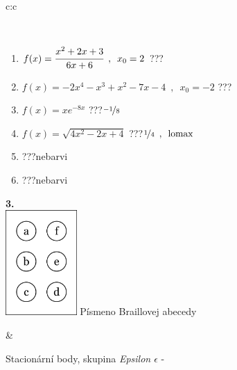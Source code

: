 \documentclass[10pt]{report}
\begin{document}
\begin{tabular}{c:c}
\begin{minipage}[c][104.5mm][t]{0.5\linewidth}
\begin{center}
\begin{minipage}{0.95\linewidth}
\begin{center}
\end{center}
\end{minipage}
\\[1mm]
\begin{minipage}{0.79\linewidth}
\begin{center}
\begin{varwidth}{\linewidth}
\begin{enumerate}
\normalsize
\item $f(x)=\cfrac{x^2+2x+3}{6x+6}\enspace , \enspace x_0=2$\quad \dotfill\; ???\;\dotfill \quad {}
\item $f(x)=-2x^4-x^3+x^2-7x-4\enspace , \enspace x_0=-2$\quad \dotfill\; ???\;\dotfill \quad {}
\item $f(x)=xe^{-8x}$\quad \dotfill\; ???\;\dotfill \quad $\nicefrac{-1}{8}$
\item $f(x)=\sqrt{4x^2-2x+4}$\quad \dotfill\; ???\;\dotfill \quad $\nicefrac{1}{4}\enspace , \enspace\mathrm{lomax}$
\item \quad \dotfill\; ???\;\dotfill \quad nebarvi
\item \quad \dotfill\; ???\;\dotfill \quad nebarvi
\end{enumerate}
\end{varwidth}
\end{center}
\end{minipage}
\begin{minipage}{0.20\linewidth}
\begin{center}
{\Huge\bfseries 3.} \\[2mm]
\includegraphics[height=40mm]{../images/braille.png}
{\small Písmeno Braillovej abecedy}
\end{center}
\end{minipage}
\end{center}
\end{minipage}
&
\begin{minipage}[c][104.5mm][t]{0.5\linewidth}
\begin{center}
\vspace{7mm}
{\huge Stacionární body, skupina \textit{Epsilon $\epsilon$} -}\\[5mm]

\end{center}
\end{minipage}
\end{tabular}
\end{document}
